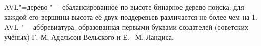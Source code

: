AVL"=дерево "--- сбалансированное по высоте бинарное дерево поиска: для каждой его вершины высота её двух поддеревьев различается не более чем на 1.
AVL "--- аббревиатура, образованная первыми буквами создателей (советских учёных) Г. М. Адельсон-Вельского и Е. \, М. Ландиса.